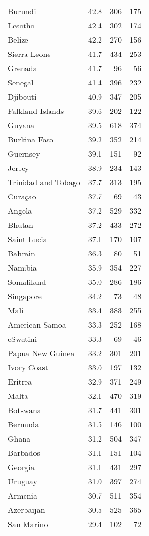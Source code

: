\begin{table}[htbp]
\begin{tabular}{lrrr}
Burundi & 42.8 & 306 & 175 \\
Lesotho & 42.4 & 302 & 174 \\
Belize & 42.2 & 270 & 156 \\
Sierra Leone & 41.7 & 434 & 253 \\
Grenada & 41.7 & 96 & 56 \\
Senegal & 41.4 & 396 & 232 \\
Djibouti & 40.9 & 347 & 205 \\
Falkland Islands & 39.6 & 202 & 122 \\
Guyana & 39.5 & 618 & 374 \\
Burkina Faso & 39.2 & 352 & 214 \\
Guernsey & 39.1 & 151 & 92 \\
Jersey & 38.9 & 234 & 143 \\
Trinidad and Tobago & 37.7 & 313 & 195 \\
Curaçao & 37.7 & 69 & 43 \\
Angola & 37.2 & 529 & 332 \\
Bhutan & 37.2 & 433 & 272 \\
Saint Lucia & 37.1 & 170 & 107 \\
Bahrain & 36.3 & 80 & 51 \\
Namibia & 35.9 & 354 & 227 \\
Somaliland & 35.0 & 286 & 186 \\
Singapore & 34.2 & 73 & 48 \\
Mali & 33.4 & 383 & 255 \\
American Samoa & 33.3 & 252 & 168 \\
eSwatini & 33.3 & 69 & 46 \\
Papua New Guinea & 33.2 & 301 & 201 \\
Ivory Coast & 33.0 & 197 & 132 \\
Eritrea & 32.9 & 371 & 249 \\
Malta & 32.1 & 470 & 319 \\
Botswana & 31.7 & 441 & 301 \\
Bermuda & 31.5 & 146 & 100 \\
Ghana & 31.2 & 504 & 347 \\
Barbados & 31.1 & 151 & 104 \\
Georgia & 31.1 & 431 & 297 \\
Uruguay & 31.0 & 397 & 274 \\
Armenia & 30.7 & 511 & 354 \\
Azerbaijan & 30.5 & 525 & 365 \\
San Marino & 29.4 & 102 & 72 \\

\end{tabular}
\end{table}
